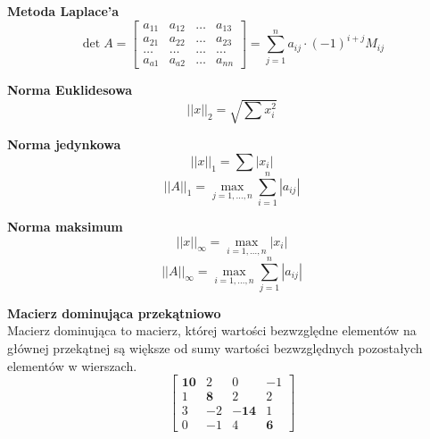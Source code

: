 \documentclass[../mn-notatki.tex]{subfiles}
\begin{document}
\begin{tcolorbox}
\textbf{Metoda Laplace'a}
\[
\det A =
\begin{bmatrix}
a_{11} & a_{12} & \ldots &a_{13}\\
a_{21} & a_{22} & \ldots &a_{23}\\
\ldots & \ldots & \ldots &\ldots\\
a_{a1} & a_{a2} & \ldots &a_{nn}
\end{bmatrix}
=
\sum_{j=1}^{n} a_{ij} \cdot (-1)^{i+j} M_{ij}
\]
\end{tcolorbox}

\begin{tcolorbox}
\textbf{Norma Euklidesowa}
\[
||x||_2 = \sqrt{\sum x_i^2}
\]
\end{tcolorbox}

\begin{tcolorbox}
\textbf{Norma jedynkowa}
\[
||x||_1 = \sum |x_i|
\]
\[
||A||_1 = \max_{j = 1, \ldots, n} \sum_{i = 1}^{n} |a_{ij}|
\]
\end{tcolorbox}

\begin{tcolorbox}
\textbf{Norma maksimum}
\[
||x||_\infty = \max_{i = 1, \ldots, n} |x_i|
\]
\[
||A||_\infty = \max_{i = 1, \ldots, n} \sum_{j = 1}^{n} |a_{ij}|
\]
\end{tcolorbox}

\begin{tcolorbox}
\textbf{Macierz dominująca przekątniowo}\\
Macierz dominująca to macierz, której wartości bezwzględne elementów na głównej
przekątnej są większe od sumy wartości bezwzględnych pozostałych elementów w
wierszach.
\[
{\displaystyle {\begin{bmatrix}\mathbf {10} &2&0&-1\\1&\mathbf {8} &2&2\\3&-2&\mathbf {-14} &1\\0&-1&4&\mathbf {6} \end{bmatrix}}}
\]
\end{tcolorbox}


\pagebreak
\end{document}
